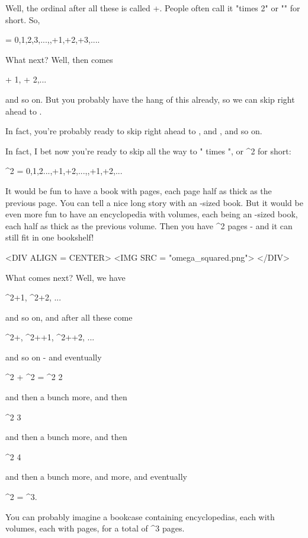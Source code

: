 Well, the ordinal after all these is called \omega +\omega .  People
often call it "\omega  times 2" or "" for
short.  So,

 = {0,1,2,3,...,\omega ,\omega +1,\omega +2,\omega +3,....}

What next?  Well, then comes 

 + 1,  + 2,...

and so on.  But you probably have the hang of this already, so 
we can skip right ahead to .

In fact, you're probably ready to skip right ahead to ,
and , and so on.

In fact, I bet now you're ready to skip all the way to "\omega 
times \omega ", or \omega ^{2} for short:

\omega ^{2} = 
{0,1,2...\omega ,\omega +1,\omega +2,...,,+1,+2,...}

It would be fun to have a book with \omega  pages, each page half 
as thick as the previous page.  You can tell a nice long story 
with an \omega -sized book.  But it would be even more fun to have 
an encyclopedia with \omega  volumes, each being an \omega -sized book,
each half as thick as the previous volume.  Then you have \omega ^{2} 
pages - and it can still fit in one bookshelf!

<DIV ALIGN = CENTER>
<IMG SRC = "omega_squared.png">
</DIV>

What comes next?  Well, we have 

\omega ^{2}+1, \omega ^{2}+2, ...

and so on, and after all these come 

\omega ^{2}+\omega , \omega ^{2}+\omega +1, \omega ^{2}+\omega +2, ...

and so on - and eventually 

\omega ^{2} + \omega ^{2} = \omega ^{2} 2

and then a bunch more, and then

\omega ^{2} 3

and then a bunch more, and then

\omega ^{2} 4
 
and then a bunch more, and more, and eventually

\omega ^{2} \omega  = \omega ^{3}.

You can probably imagine a bookcase containing \omega  encyclopedias,
each with \omega  volumes, each with \omega  pages, for a total of
\omega ^{3} pages.

